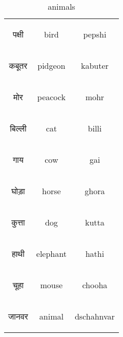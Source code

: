  \begin{table}[H]
    \centering 
    \begin{tabular}{c|c|c}
        \begin{hindi} पक्षी \end{hindi} & bird & pepshi \\
        \begin{hindi} कबूतर \end{hindi} & pidgeon & kabuter \\
        \begin{hindi}  मोर \end{hindi} & peacock & mohr \\
        \begin{hindi} बिल्ली \end{hindi} & cat & billi \\
        \begin{hindi}  गाय \end{hindi} & cow & gai \\
        \begin{hindi}  घोड़ा  \end{hindi} & horse& ghora  \\
        \begin{hindi}  कुत्ता \end{hindi} & dog & kutta \\
        \begin{hindi}  हाथी \end{hindi} & elephant & hathi \\
        \begin{hindi}  चूहा \end{hindi} & mouse & chooha \\
        \begin{hindi}  जानवर \end{hindi} & animal & dschahnvar \\
    \end{tabular}
    \caption{animals}
    \label{tab:nouns_animals}
\end{table}



